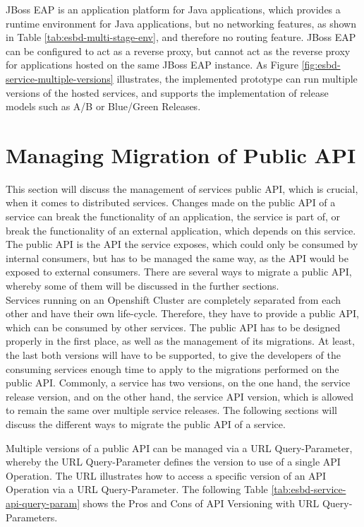 JBoss EAP is an application platform for Java applications, which provides a runtime environment for Java applications, but no networking features, as shown in Table \vref{tab:esbd-multi-stage-env}, and therefore no routing feature. JBoss EAP can be configured to act as a reverse proxy, but cannot act as the reverse proxy for applications hosted on the same JBoss EAP instance. As Figure \vref{fig:esbd-service-multiple-versions} illustrates, the implemented prototype can run multiple versions of the hosted services, and supports the implementation of release models such as A/B or Blue/Green Releases.

\section{Managing Migration of Public API}
\label{sec:esbd-multi-stage-env}
This section will discuss the management of services public API, which is crucial, when it comes to distributed services. Changes made on the public API of a service can break the functionality of an application, the service is part of, or break the functionality of an external application, which depends on this service. The public API is the API the service exposes, which could only be consumed by internal consumers, but has to be managed the same way, as the API would be exposed to external consumers. There are several ways to migrate a public API, whereby some of them will be discussed in the further sections. \\  

Services running on an Openshift Cluster are completely separated from each other and have their own life-cycle. Therefore, they have to provide a public API, which can be consumed by other services. The public API has to be designed properly in the first place, as well as the management of its migrations. At least, the last both versions will have to be supported, to give the developers of the consuming services enough time to apply to the migrations performed on the public API. Commonly, a service has two versions, on the one hand, the service release version, and on the other hand, the service API version, which is allowed to remain the same over multiple service releases. The following sections will discuss the different ways to migrate the public API of a service.

Multiple versions of a public API can be managed via a URL Query-Parameter, whereby the URL Query-Parameter defines the version to use of a single API Operation. The URL  illustrates how to access a specific version of an API Operation via a URL Query-Parameter. The following Table \vref{tab:esbd-service-api-query-param} shows the Pros and Cons of API Versioning with URL Query-Parameters.

